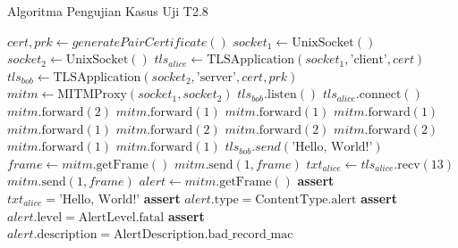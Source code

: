 \begin{algorithm}
  \caption{Algoritma Pengujian Kasus Uji T2.8}
  \label{alg:unit.test.t2.8}
  \begin{algorithmic}
    \State $cert, prk \gets generatePairCertificate()$
    \State $socket_1 \gets \text{UnixSocket}()$
    \State $socket_2 \gets \text{UnixSocket}()$
    \State $tls_{alice} \gets \text{TLSApplication}(socket_1, \text{'client'}, cert)$ 
    \State $tls_{bob} \gets \text{TLSApplication}(socket_2, \text{'server'}, cert, prk)$
    \State $mitm \gets \text{MITMProxy}(socket_1, socket_2)$
    \State
    \State $tls_{bob}.\text{listen}()$  
    \State $tls_{alice}.\text{connect}()$  
    \State
    \State $mitm.\text{forward}(2)$ 
    \State $mitm.\text{forward}(1)$ 
    \State $mitm.\text{forward}(1)$ 
    \State $mitm.\text{forward}(1)$ 
    \State $mitm.\text{forward}(1)$ 
    \State $mitm.\text{forward}(2)$ 
    \State $mitm.\text{forward}(2)$ 
    \State $mitm.\text{forward}(2)$ 
    \State $mitm.\text{forward}(1)$ 
    \State $mitm.\text{forward}(1)$ 
    \State
    \State $tls_{bob}.send(\text{'Hello, World!'})$
    \State $frame \gets mitm.\text{getFrame}()$
    \State $mitm.\text{send}(1, frame)$
    \State
    \State $txt_{alice} \gets tls_{alice}.\text{recv}(13)$
    \State $mitm.\text{send}(1, frame)$ 
    \State
    \State $alert \gets mitm.\text{getFrame}()$
    \State \textbf{assert} $txt_{alice} = \text{'Hello, World!'}$
    \State \textbf{assert} $alert.\text{type} = \text{ContentType.alert}$
    \State \textbf{assert} $alert.\text{level} = \text{AlertLevel.fatal}$
    \State \textbf{assert} $alert.\text{description} = \text{AlertDescription.bad\_record\_mac}$    
  \end{algorithmic}
\end{algorithm}

